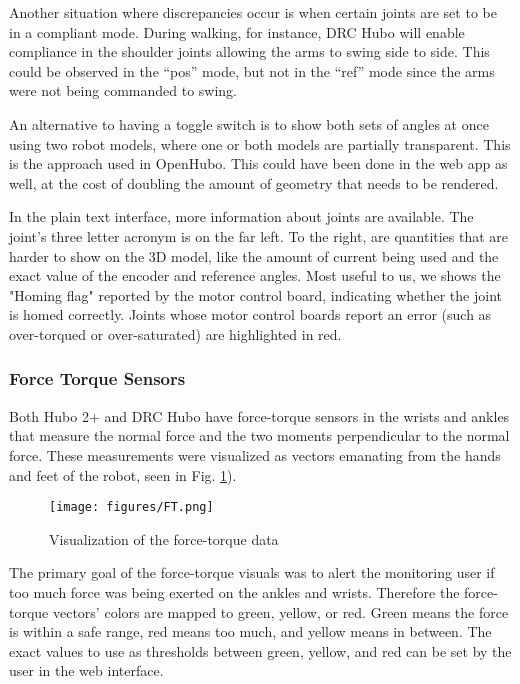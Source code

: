 \documentclass[letterpaper, 10 pt, conference]{ieee/ieeeconf}  %
\begin{document}
Another situation where discrepancies occur is when certain joints are set to be in a compliant mode.
During walking, for instance, DRC Hubo will enable compliance in the shoulder joints allowing the arms to swing side to side.
This could be observed in the ``pos'' mode, but not in the ``ref'' mode since the arms were not being commanded to swing.

An alternative to having a toggle switch is to show both sets of angles at once using two robot models, where one or both models are partially transparent.
This is the approach used in OpenHubo.
This could have been done in the web app as well, at the cost of doubling the amount of geometry that needs to be rendered.

In the plain text interface, more information about joints are available.
The joint's three letter acronym is on the far left.
To the right, are quantities that are harder to show on the 3D model, like the amount of current being used and the exact value of the encoder and reference angles.
Most useful to us, we shows the "Homing flag" reported by the motor control board, indicating whether the joint is homed correctly.
Joints whose motor control boards report an error (such as over-torqued or over-saturated) are highlighted in red.

\subsubsection{Force Torque Sensors}
Both Hubo 2+ and DRC Hubo have force-torque sensors in the wrists and ankles that measure the normal force and the two moments perpendicular to the normal force.
These measurements were visualized as vectors emanating from the hands and feet of the robot, seen in Fig. \ref{fig:FT}).

\begin{figure}[thpb]
  \centering
  \texttt{[image: figures/FT.png]}
  \caption{Visualization of the force-torque data}
  \label{fig:FT}
\end{figure}

The primary goal of the force-torque visuals was to alert the monitoring user if too much force was being exerted on the ankles and wrists.
Therefore the force-torque vectors' colors are mapped to green, yellow, or red. 
Green means the force is within a safe range, red means too much, and yellow means in between.
The exact values to use as thresholds between green, yellow, and red can be set by the user in the web interface.
\end{document}
